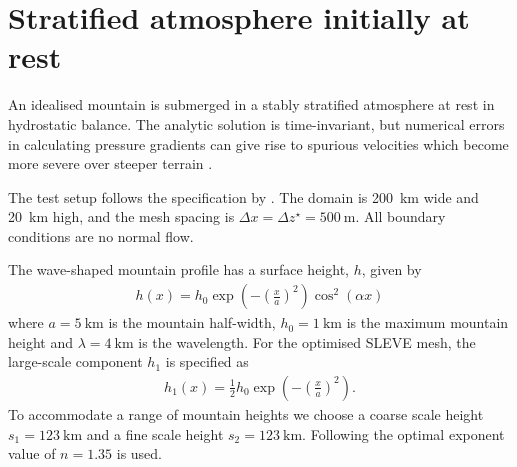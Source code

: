 \section{Stratified atmosphere initially at rest}
\label{sec:slanted:resting}


An idealised mountain is submerged in a stably stratified atmosphere at rest in hydrostatic balance.  The analytic solution is time-invariant, but numerical errors in calculating pressure gradients can give rise to spurious velocities which become more severe over steeper terrain \citep{klemp2011}.

The test setup follows the specification by \cite{klemp2011}.  The domain is \SI{200}{\kilo\meter} wide and \SI{20}{\kilo\meter} high, and the mesh spacing is \(\Delta x = \Delta z^\star = \SI{500}{\meter}\).  All boundary conditions are no normal flow.

The wave-shaped mountain profile has a surface height, $h$, given by
\begin{align}
	h(x) = h_0 \exp \left( - \left( \frac{x}{a} \right)^2 \right) \cos^2 \left( \alpha x \right) \label{eqn:resting:mountain}
\end{align}
where $a = \SI{5}{\kilo\meter}$ is the mountain half-width, $h_0 = \SI{1}{\kilo\meter}$ is the maximum mountain height and $\lambda = \SI{4}{\kilo\meter}$ is the wavelength.  For the optimised SLEVE mesh, the large-scale component $h_1$ is specified as
\begin{align}
	h_1(x) = \frac{1}{2} h_0 \exp \left( - \left( \frac{x}{a} \right)^2 \right) \text{.}
\end{align}
To accommodate a range of mountain heights we choose a coarse scale height $s_1 = \SI{123}{\kilo\meter}$ and a fine scale height $s_2 = \SI{123}{\kilo\meter}$.  Following \citet{leuenberger2010} the optimal exponent value of $n = \num{1.35}$ is used.

